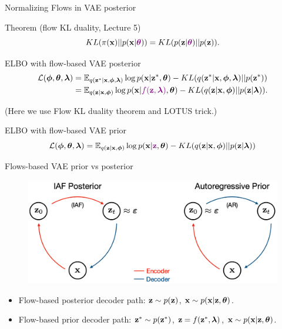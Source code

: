 \documentclass{beamer}
\begin{document}
\begin{frame}{Normalizing Flows in VAE posterior}

	\begin{block}{Theorem (flow KL duality, Lecture 5)}
		\vspace{-0.3cm}
		\[
			KL(\pi(\mathbf{x}) || p(\mathbf{x} | {\color{violet}\boldsymbol{\theta}})) = KL(p(\mathbf{z} | {\color{violet}\boldsymbol{\theta}}) || p(\mathbf{z})).
		\]
		\vspace{-0.5cm}
	\end{block}
	\begin{block}{ELBO with flow-based VAE posterior}
		\vspace{-0.6cm}
		\begin{align*}
		\mathcal{L} (\boldsymbol{\phi}, \boldsymbol{\theta}, \boldsymbol{\lambda}) &=  \mathbb{E}_{q(\mathbf{z}^* | \mathbf{x}, \boldsymbol{\phi}, \boldsymbol{\lambda})} \log p(\mathbf{x} | \mathbf{z}^*, \boldsymbol{\theta}) - KL (q(\mathbf{z}^* | \mathbf{x}, \boldsymbol{\phi}, \boldsymbol{\lambda}) || p(\mathbf{z}^*)) \\ 
		&=  \mathbb{E}_{q(\mathbf{z} | \mathbf{x}, \boldsymbol{\phi})} \log p(\mathbf{x} | {\color{violet}f(\mathbf{z}, \boldsymbol{\lambda})}, \boldsymbol{\theta}) - KL (q(\mathbf{z} | \mathbf{x}, \boldsymbol{\phi}) || p(\mathbf{z} | \boldsymbol{\lambda})).
		\end{align*}
		\vspace{-0.6cm}
	\end{block}
	{\color{gray}(Here we use Flow KL duality theorem and LOTUS trick.)}
	
	\begin{block}{ELBO with flow-based VAE prior}
		\vspace{-0.5cm}
		\[
			\mathcal{L}(\boldsymbol{\phi}, \boldsymbol{\theta}, \boldsymbol{\lambda}) = \mathbb{E}_{q(\mathbf{z} | \mathbf{x}, \boldsymbol{\phi})} \log p(\mathbf{x} | {\color{violet}\mathbf{z}}, \boldsymbol{\theta}) - KL( q(\mathbf{z} | \mathbf{x}, \boldsymbol{\phi}) || p(\mathbf{z} | \boldsymbol{\lambda}))
		\]
		\vspace{-0.5cm}
	\end{block}
\end{frame}
\begin{frame}{Flows-based VAE prior vs posterior}
	\vspace{-1.5cm}
	\begin{figure}
		\includegraphics[width=0.65\linewidth]{figs/prior_vs_posterior}
	\end{figure}
	\begin{itemize}
		\item Flow-based posterior decoder path: $\mathbf{z} \sim p(\mathbf{z})$, $\mathbf{x} \sim p(\mathbf{x}|\mathbf{z}, \boldsymbol{\theta})$.
		\item Flow-based prior decoder path: $\mathbf{z}^* \sim p(\mathbf{z}^*)$, $\mathbf{z} = f(\mathbf{z}^*, \boldsymbol{\lambda})$, $\mathbf{x} \sim p(\mathbf{x}|\mathbf{z}, \boldsymbol{\theta})$. 
	\end{itemize}
\end{frame}
\end{document}
